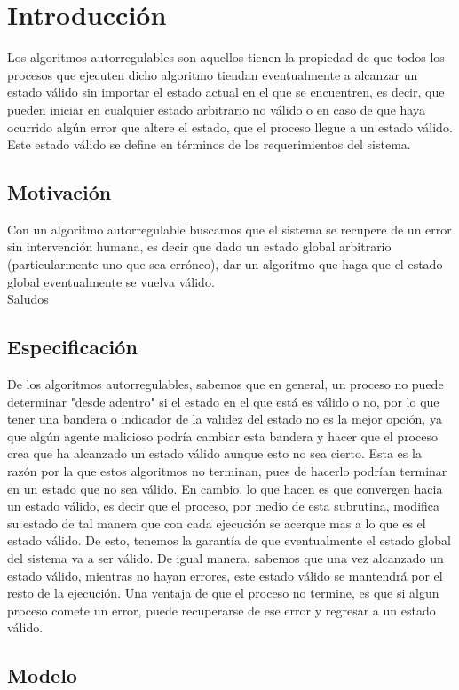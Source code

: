 \documentclass[12pt,a4paper]{article}
\begin{document}
\section{Introducción}{
    Los algoritmos autorregulables son aquellos tienen la propiedad de que todos los procesos que ejecuten dicho algoritmo tiendan eventualmente a alcanzar un estado válido sin importar el estado actual en el que se encuentren, es decir, que pueden iniciar en cualquier estado arbitrario no válido o en caso de que haya ocurrido algún error que altere el estado, que el proceso llegue a un estado válido. Este estado válido se define en términos de los requerimientos del sistema.
\subsection{Motivación}{
    Con un algoritmo autorregulable buscamos que el sistema se recupere de un error sin intervención humana, es decir que dado un estado global arbitrario (particularmente uno que sea erróneo), dar un algoritmo que haga que el estado global eventualmente se vuelva válido.\\
    \indent Saludos
}
\subsection{Especificación}{
    De los algoritmos autorregulables, sabemos que en general, un proceso no puede determinar "desde adentro" si el estado en el que está es válido o no, por lo que tener una bandera o indicador de la validez del estado no es la mejor opción, ya que algún agente malicioso podría cambiar esta bandera y hacer que el proceso crea que ha alcanzado un estado válido aunque esto no sea cierto. Esta es la razón por la que estos algoritmos no terminan, pues de hacerlo podrían terminar en un estado que no sea válido. En cambio, lo que hacen es que convergen hacia un estado válido, es decir que el proceso, por medio de esta subrutina, modifica su estado de tal manera que con cada ejecución se acerque mas a lo que es el estado válido. De esto, tenemos la garantía de que eventualmente el estado global del sistema va a ser válido. De igual manera, sabemos que una vez alcanzado un estado válido, mientras no hayan errores, este estado válido se mantendrá por el resto de la ejecución. Una ventaja de que el proceso no termine, es que si algun proceso comete un error, puede recuperarse de ese error y regresar a un estado válido.

}
\subsection{Modelo}{}
}
\end{document}
